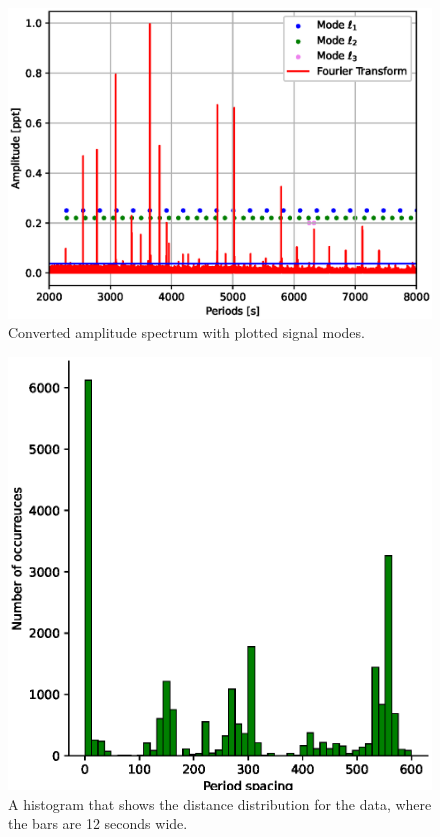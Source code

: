\documentclass{aa}
\begin{document}
\begin{figure}[h]
    \centering
    \includegraphics[scale=1]{images/ehhhhh.eps}
    \caption{Converted amplitude spectrum with plotted signal modes.}
    \label{fig:my_label_30}
\end{figure}

\begin{figure}[h]
    \centering
    \includegraphics[scale=1]{images/his_all_data.eps}
    \caption{A histogram that shows the distance distribution for the data, where the bars are 12 seconds wide.}
    \label{fig:my_label_4}
\end{figure}
\end{document}

